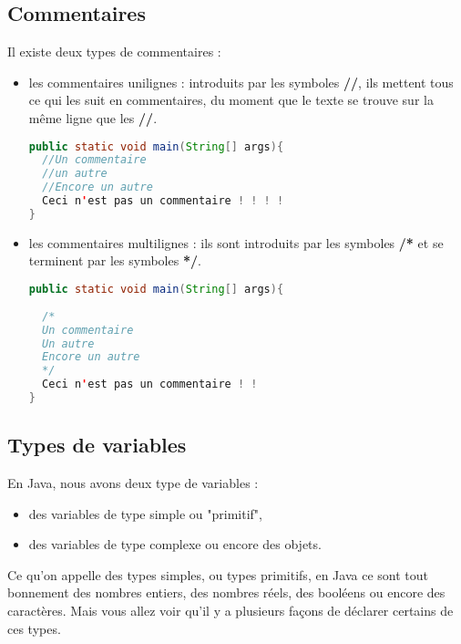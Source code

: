 \documentclass[a4paper,twoside]{article}
\begin{document}
\subsection{Commentaires}
Il existe deux types de commentaires : 
\begin{itemize}
\item les commentaires unilignes : introduits par les symboles \textbf{//}, ils mettent tous ce qui les suit en commentaires, du moment que le texte se trouve sur la même ligne que les \textbf{//}.
\begin{lstlisting}[language=java]
public static void main(String[] args){
  //Un commentaire
  //un autre
  //Encore un autre
  Ceci n'est pas un commentaire ! ! ! !
}
\end{lstlisting}


\item les commentaires multilignes : ils sont introduits par les symboles \textbf{/*} et se terminent par les symboles \textbf{*/}.
\begin{lstlisting}[language=java]
public static void main(String[] args){
 
  /*
  Un commentaire
  Un autre
  Encore un autre
  */
  Ceci n'est pas un commentaire ! ! 
}
\end{lstlisting}
\end{itemize}

\subsection{Types de variables}\label{sec:types_variables}
En Java, nous avons deux type de variables :
\begin{itemize}
\item des variables de type simple ou "primitif",
\item des variables de type complexe ou encore des objets.
\end{itemize}

Ce qu'on appelle des types simples, ou types primitifs, en Java ce sont tout bonnement des nombres entiers, des nombres réels, des booléens ou encore des caractères. Mais vous allez voir qu'il y a plusieurs façons de déclarer certains de ces types.
\end{document}
